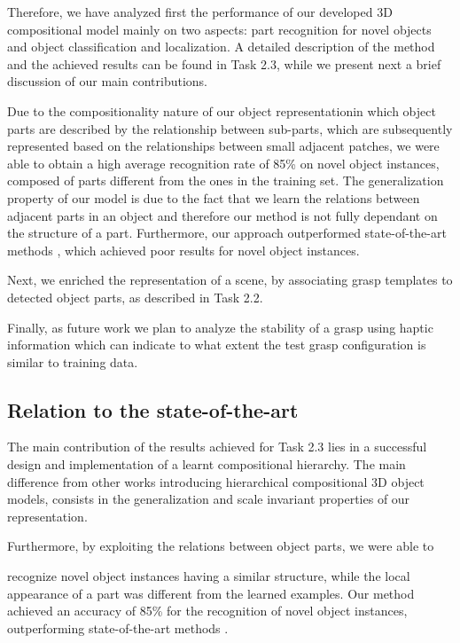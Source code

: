 \documentclass[a4paper,11pt,pdf]{pacmanreport}
\begin{document}
Therefore, we have analyzed first the performance of our developed 3D compositional model mainly on two aspects: part recognition for novel objects 
and object classification and localization. A detailed description of the method 
and the achieved results can be found in Task 2.3, while we present next a brief 
discussion of our main contributions.

Due to the compositionality nature of our object representationin which object 
parts are described by the relationship between sub-parts, which are 
subsequently represented based on the relationships between small adjacent 
patches, we were able to obtain a high average recognition rate of 85\% on novel 
object instances, composed of parts different from the ones in the training set. 
The generalization property of our model is due to the fact that we learn the 
relations between adjacent parts in an object and therefore our method is not 
fully dependant on the structure of a part. Furthermore, our approach 
outperformed state-of-the-art methods \cite{vfh}, which achieved poor results 
for novel object instances.

Next, we enriched the representation of a scene, by associating grasp templates to detected object parts, as described in Task 2.2.

Finally, as future work we plan to analyze the stability of a grasp using haptic information which can indicate to what extent the test grasp configuration is similar to training data.

\subsection{Relation to the state-of-the-art}

The main contribution of the results achieved for Task 2.3 lies in a successful design and implementation of a learnt compositional hierarchy. The main 
difference from other works \cite{rel2,comp2} introducing hierarchical 
compositional 3D object models, consists in the generalization and scale 
invariant properties of our representation. 

Furthermore, by exploiting the relations between object parts, we were able to 

recognize novel object instances having a similar structure, while the local 
appearance of a part was different from the learned examples. Our method 
achieved an accuracy of 85\% for the recognition of novel object instances, 
outperforming state-of-the-art methods \cite{vfh}. 
\end{document}
